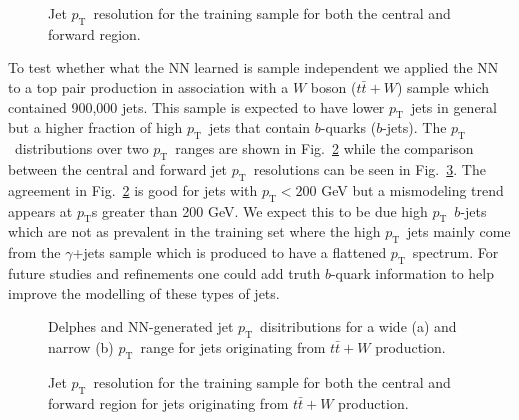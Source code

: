 \documentclass[showpacs,showkeys,preprint,prd,nofootinbib,linenumbers,12pt,superscriptaddress]{revtex4-1}
\def\pt{\ensuremath{p_{\mathrm{T}}}}
\begin{document}
\begin{figure}[htb]
  \caption{Jet \pt\ resolution for the training sample for both the central and forward region. }
  \label{fig:nnRes}
\end{figure}

To test whether what the NN learned is sample independent we applied the NN to a top pair production in association with a $W$ boson ($t\bar{t}+W$) sample which contained 900,000 jets. This sample is expected to have lower \pt\ jets in general but a higher fraction of high \pt\ jets that contain $b$-quarks ($b$-jets). The \pt\ distributions over two \pt\ ranges are shown in Fig.~\ref{fig:pTNNVsDelphes_ttW} while the comparison between the central and forward jet \pt\ resolutions can be seen in Fig.~\ref{fig:nnRes_ttW}. The agreement in Fig.~\ref{fig:pTNNVsDelphes_ttW} is good for jets with $\pt<200$ GeV but a mismodeling trend appears at \pt s greater than 200 GeV. We expect this to be due high \pt\ $b$-jets which are not as prevalent in the training set where the high \pt\ jets mainly come from the $\gamma$+jets sample which is produced to have a flattened \pt\ spectrum. For future studies and refinements one could add truth $b$-quark information to help improve the modelling of these types of jets.  


\begin{figure}[htb]
  \caption{Delphes and NN-generated jet \pt\ disitributions for a wide (a) and narrow (b) \pt\ range for jets originating from $t\bar{t}+W$ production.}
  \label{fig:pTNNVsDelphes_ttW}
\end{figure}


\begin{figure}[htb]
  \caption{Jet \pt\ resolution for the training sample for both the central and forward region for jets originating from $t\bar{t}+W$ production.}
  \label{fig:nnRes_ttW}
\end{figure}
\end{document}
